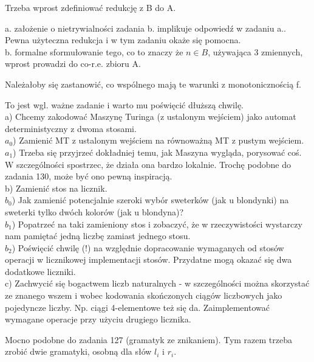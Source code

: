 \documentclass[a4paper,11pt]{article}
\newenvironment{zadanie}[1]
  {\renewcommand\theinnercustomthm{#1}\innercustomthm}
  {\endinnercustomthm}
\begin{document}
\begin{zadanie}{101}
Trzeba wprost zdefiniować redukcję z B do A. 
\end{zadanie}

\begin{zadanie}{102}
a. założenie o nietrywialności zadania b. implikuje odpowiedź w zadaniu a.. Pewna użyteczna redukcja i w tym zadaniu okaże się
pomocna. \\
b. formalne sformułowanie tego, co to znaczy że $n \in B$, używająca 3 zmiennych, wprost prowadzi do co-r.e. zbioru A.
\end{zadanie}

\begin{zadanie}{103}
Należałoby się zastanowić, co wspólnego mają te warunki z monotonicznością f.
\end{zadanie}

\begin{zadanie}{110}
To jest wgl. ważne zadanie i warto mu poświęcić dłuższą chwilę. \\
a) Chcemy zakodować Maszynę Turinga (z ustalonym wejściem) jako automat deterministyczny z dwoma stosami. \\
$a_0$) Zamienić MT z ustalonym wejściem na równoważną MT z pustym wejściem. \\
$a_1$) Trzeba się przyjrzeć dokładniej temu,
jak Maszyna wygląda, porysować coś. W szczególności spostrzec, że działa ona bardzo lokalnie. Trochę podobne do zadania 
130, może być ono pewną inspiracją. \\
b) Zamienić stos na licznik. \\
$b_0$) Jak zamienić potencjalnie szeroki wybór sweterków (jak u blondynki) na sweterki tylko dwóch kolorów (jak u blondyna)? \\
$b_1$) Popatrzeć na taki zamieniony stos i zobaczyć, że w rzeczywistości wystarczy nam pamiętać jedną liczbę zamiast jednego 
stosu. \\
$b_2$) Poświęcić chwilę (!) na względnie dopracowanie wymaganych od stosów operacji w licznikowej implementacji stosów. 
Przydatne mogą okazać się dwa dodatkowe liczniki. \\
c) Zachwycić się bogactwem liczb naturalnych - w szczególności można skorzystać ze znanego wszem i wobec kodowania
skończonych ciągów liczbowych jako pojedyncze liczby. Np. ciągi 4-elementowe też się da. Zaimplementować wymagane
operacje przy użyciu drugiego licznika.
\end{zadanie}

\begin{zadanie}{114}
Mocno podobne do zadania 127 (gramatyk ze znikaniem). Tym razem trzeba zrobić dwie gramatyki, osobną dla słów $l_i$ i $r_i$.
\end{zadanie}
\end{document}

